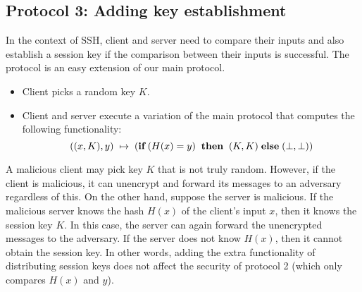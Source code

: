 


\subsection{Protocol 3: Adding key establishment}
\label{sec:protod}

In the context of SSH, client and server need to compare their inputs and
also establish a session key if the comparison between their inputs is 
successful.  The protocol is an easy extension of our main protocol.
\begin{itemize}
\item Client picks a random key $K$.
\item Client and server execute a variation of the main protocol
that computes the following functionality:
\[
((x,K),y) \; \mapsto \; (\mbox{\bf if} \; (H(x) = y) \;\; \mbox{\bf
then} \;\; (K,K) \;\mbox{\bf else} \; (\bot,\bot))
\]
\end{itemize}

A malicious client may pick key $K$ that is not truly random.  However,
if the client is malicious, it can unencrypt and forward its messages to
an adversary regardless of this. On the other hand, suppose the server is
malicious. If the malicious server knows the hash $H(x)$ of the client's
input $x$, then it knows the session key $K$. In this case, the server
can again forward the unencrypted messages to the adversary. If the
server does not know $H(x)$, then it cannot obtain the session key. In
other words, adding the extra functionality of distributing session keys
does not affect the security of protocol 2 (which only compares $H(x)$
and $y$).



